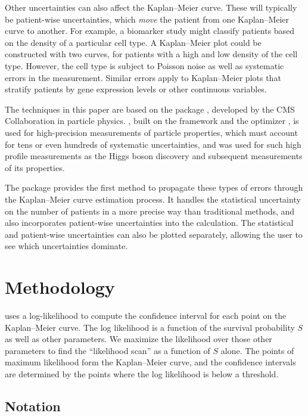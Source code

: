 \documentclass[article]{jss}
\newcommand{\KM}{Kaplan--Meier} %
\begin{document}
Other uncertainties can also affect the \KM{} curve.  These will typically be patient-wise uncertainties, which \emph{move} the patient from one \KM{} curve to another.  For example, a biomarker study might classify patients based on the density of a particular cell type.  A \KM{} plot could be constructed with two curves, for patients with a high and low density of the cell type.  However, the cell type is subject to Poisson noise as well as systematic errors in the measurement.  Similar errors apply to \KM{} plots that stratify patients by gene expression levels or other continuous variables.

The techniques in this paper are based on the  package \citep{CAT-23-001}, developed by the CMS Collaboration in particle physics\@.  , built on the  framework \citep{RooFit} and the  optimizer \citep{minuit}, is used for high-precision measurements of particle properties, which must account for tens or even hundreds of systematic uncertainties, and was used for such high profile measurements as the Higgs boson discovery \citep{HIG-12-028} and subsequent measurements of its properties.

The  package provides the first method to propagate these types of errors through the \KM{} curve estimation process.  It handles the statistical uncertainty on the number of patients in a more precise way than traditional methods, and also incorporates patient-wise uncertainties into the calculation.  The statistical and patient-wise uncertainties can also be plotted separately, allowing the user to see which uncertainties dominate.

\section{Methodology}\label{sec:methodology}

 uses a log-likelihood to compute the confidence interval for each point on the \KM{} curve.  The log likelihood is a function of the survival probability \(S\) as well as other parameters.  We maximize the likelihood over those other parameters to find the ``likelihood scan'' as a function of \(S\) alone.  The points of maximum likelihood form the \KM{} curve, and the confidence intervals are determined by the points where the log likelihood is below a threshold.

\subsection{Notation}\label{sec:notation}
\end{document}
